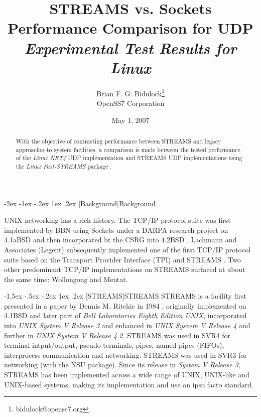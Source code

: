 \documentclass[letterpaper,final,notitlepage,twocolumn,10pt,twoside]{article}
\makeatletter
\renewcommand\section{\@startsection {section}{1}{\z@}%
                                   {-2ex \@plus -1ex \@minus -.2ex}%
                                   {1ex \@plus .2ex}%
                                   {\normalfont\large\bfseries}}
\renewcommand\subsection{\@startsection{subsection}{2}{\z@}%
                                     {-1.5ex \@plus -.5ex \@minus -.2ex}%
                                     {1ex \@plus .2ex}%
                                     {\normalfont\normalsize\bfseries}}
\makeatother
\begin{document}

\title{STREAMS vs. Sockets Performance Comparison for UDP\\[0.5ex]
	{\large \textsl{Experimental Test Results for Linux}}}
\author{Brian F. G. Bidulock\thanks{bidulock@openss7.org}\\
	OpenSS7 Corporation}
\date{May 1, 2007}
\maketitle

\begin{abstract}
With the objective of contrasting performance between STREAMS and legacy
approaches to system facilities, a comparison is made between the tested
performance of the \textsl{Linux NET4} UDP implementation and STREAMS UDP
implementations using the \textsl{Linux Fast-STREAMS}
package \cite[]{LfS}.
\end{abstract}


\section[Background]{Background}

UNIX networking has a rich history.  The TCP/IP protocol suite was first
implemented by BBN using Sockets under a DARPA research project on 4.1aBSD and
then incorporated bt the CSRG into 4.2BSD \cite[]{bsd}.  Lachmann and
Associates (Legent) subsequently implemented one of the first TCP/IP protocol
suite based on the Transport Provider Interface (TPI) \cite[]{tli} and STREAMS
\cite[]{magic}.  Two other predominant TCP/IP implementations on STREAMS
surfaced at about the same time: Wollongong and Mentat.

\subsection[STREAMS]{STREAMS}
STREAMS is a facility first presented in a paper by Dennis M. Ritchie in 1984
\cite[]{Ritchie84}, originally implemented on 4.1BSD and later part of
\textsl{Bell Laboratories Eighth Edition UNIX}, incorporated into \textsl{UNIX
System V Release 3} and enhanced in \textsl{UNIX Sysvem V Release 4} and
further in \textsl{UNIX System V Release 4.2}.  STREAMS was used in SVR4 for
terminal intput/output, pseudo-terminals, pipes, named pipes (FIFOs),
interprocess communication and networking.  STREAMS was used in SVR3 for
networking (with the NSU package).  Since its release in \textsl{System V
Release 3}, STREAMS has been implemented across a wide range of UNIX,
UNIX-like and UNIX-based systems, making its implementation and use an ipso
facto standard.
\end{document}
